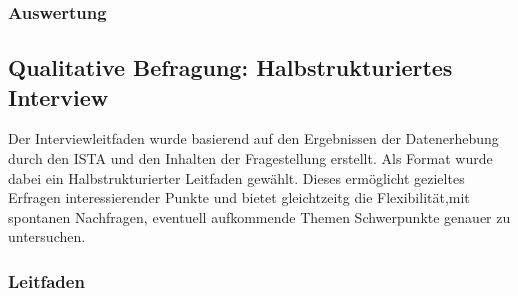 \documentclass[12pt, a4paper]{article}
\begin{document}
\subsubsection{Auswertung}


\subsection{Qualitative Befragung: Halbstrukturiertes Interview}

Der Interviewleitfaden wurde basierend auf den Ergebnissen der Datenerhebung durch den 
ISTA und den Inhalten der Fragestellung erstellt. Als Format wurde dabei ein 
Halbstrukturierter Leitfaden gewählt. Dieses ermöglicht gezieltes Erfragen interessierender
Punkte und bietet gleichtzeitg die Flexibilität,mit spontanen Nachfragen, eventuell aufkommende Themen
Schwerpunkte genauer zu untersuchen. 

\subsubsection{Leitfaden}
\end{document}
